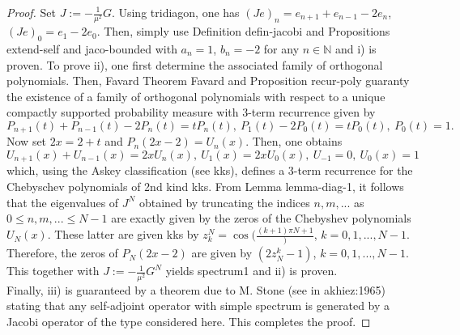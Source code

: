 \documentclass[10pt]{book}
\theoremstyle{break}
\begin{document}
\begin{proof}
Set $J:=-\frac{1}{\mu^2}G$. Using {tridiagon}, one has $(Je)_n=e_{n+1}+e_{n-1}-2e_n$, $(Je)_0=e_1-2e_0$. Then, simply use Definition {defin-jacobi} and Propositions {extend-self} and {jaco-bounded} with $a_n=1$, $b_n=-2$ for any $n\in\mathbb{N}$ and i) is proven.
To prove ii), one first determine the associated family of orthogonal polynomials. Then, Favard Theorem {Favard} and Proposition {recur-poly} guaranty the 
existence of a family of orthogonal polynomials with respect to a unique compactly supported probability measure with 3-term recurrence given by
\begin{equation}
P_{n+1}(t)+P_{n-1}(t)-2P_n(t)=tP_n(t),\ P_1(t)-2P_0(t)=tP_0(t),\ P_0(t)=1.
\end{equation}
Now set $2x=2+t$ and $P_n(2x-2)=U_n(x)$. Then, one obtains
\begin{equation}
U_{n+1}(x)+U_{n-1}(x)=2xU_n(x),\ U_1(x)=2xU_0(x),\ U_{-1}=0,\ U_0(x)=1
\end{equation}
which, using the Askey classification (see {kks}), defines a 3-term recurrence for the Chebyschev polynomials of 2nd kind {kks}. From Lemma {lemma-diag-1}, it follows that the eigenvalues of $J^N$ obtained by truncating the indices $n,m,...$ as $0\le n,m,...\le N-1$ are exactly given by the zeros of the Chebyshev polynomials $U_N(x)$. These latter are given {kks} by $z_k^N=\cos(\frac{{(k+1)\pi}{N+1}})$, $k=0,1,...,N-1$. Therefore, the zeros of $P_N(2x-2)$ are given by $(2z^k_N-1)$, $k=0,1,...,N-1$. This together with $J:=-\frac{1}{\mu^2}G^N$ yields {spectrum1} and ii) is proven. \\
Finally, iii) is guaranteed by a theorem due to M. Stone (see in {akhiez:1965}) stating that any self-adjoint operator with simple spectrum is generated by a Jacobi operator of the type considered here. This completes the proof.
\end{proof}
\end{document}
